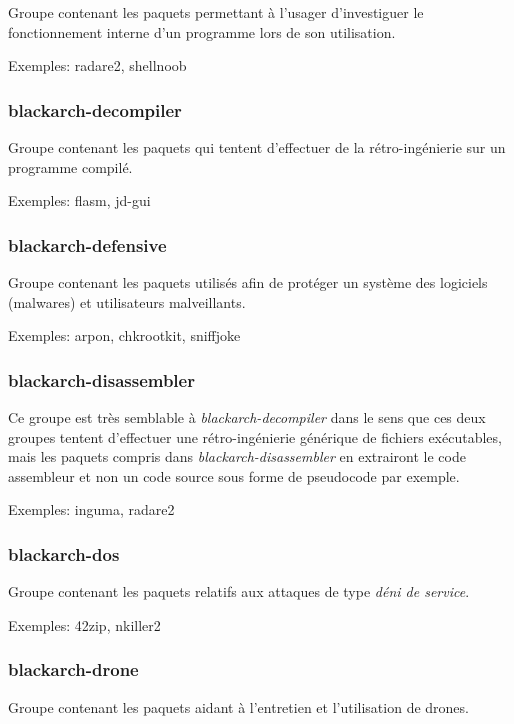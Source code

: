 \documentclass[a4paper, oneside, 11pt]{book}
\begin{document}
Groupe contenant les paquets permettant \`{a} l'usager d’investiguer le
fonctionnement interne d'un programme lors de son utilisation.

Exemples: radare2, shellnoob

\subsubsection{blackarch-decompiler}

Groupe contenant les paquets qui tentent d'effectuer de la r\'{e}tro-ing\'{e}nierie sur un programme compil\'{e}.

Exemples: flasm, jd-gui

\subsubsection{blackarch-defensive}

Groupe contenant les paquets utilis\'{e}s afin de prot\'{e}ger un syst\`{e}me des logiciels (malwares) et utilisateurs malveillants.

Exemples: arpon, chkrootkit, sniffjoke

\subsubsection{blackarch-disassembler}

Ce groupe est tr\`{e}s semblable \`{a} \textit{blackarch-decompiler} dans le sens
que ces deux groupes tentent d'effectuer une r\'{e}tro-ing\'{e}nierie g\'{e}n\'{e}rique de
fichiers ex\'{e}cutables, mais les paquets compris dans
\textit{blackarch-disassembler} en extrairont le code assembleur et non un code source sous forme de pseudocode par exemple.

Exemples: inguma, radare2

\subsubsection{blackarch-dos}

Groupe contenant les paquets relatifs aux attaques de type \textit{d\'{e}ni de service}.

Exemples: 42zip, nkiller2

\subsubsection{blackarch-drone}

Groupe contenant les paquets aidant \`{a} l'entretien et l'utilisation de drones.
\end{document}
